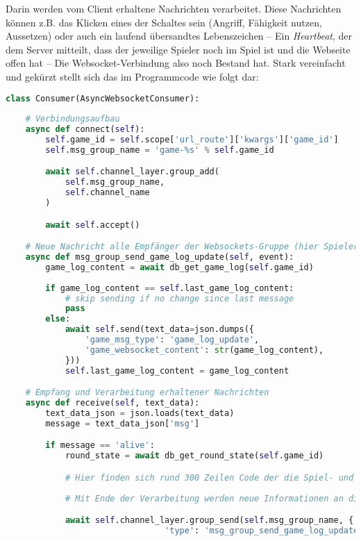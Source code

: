 Darin werden vom Client erhaltene Nachrichten verarbeitet. Diese Nachrichten können z.B. das Klicken eines der Schaltes sein (Angriff, Fähigkeit nutzen, Aussetzen) oder auch ein laufend übersandtes Lebenszeichen -- Ein \textit{Heartbeat}, der dem Server mitteilt, dass der jeweilige Spieler noch im Spiel ist und die Webseite offen hat -- Die Websocket-Verbindung also noch Bestand hat. Stark vereinfacht und gekürzt stellt sich das im Programmcode wie folgt dar: 

\begin{lstlisting}[language=python]
class Consumer(AsyncWebsocketConsumer):
 
    # Verbindungsaufbau
    async def connect(self):
        self.game_id = self.scope['url_route']['kwargs']['game_id']
        self.msg_group_name = 'game-%s' % self.game_id

        await self.channel_layer.group_add(
            self.msg_group_name,
            self.channel_name
        )

        await self.accept()

    # Neue Nachricht alle Empfänger der Websockets-Gruppe (hier Spieler des Spiels) senden
    async def msg_group_send_game_log_update(self, event):
        game_log_content = await db_get_game_log(self.game_id)
        
        if game_log_content == self.last_game_log_content:
            # skip sending if no change since last message
            pass
        else:
            await self.send(text_data=json.dumps({ 
                'game_msg_type': 'game_log_update',
                'game_websocket_content': str(game_log_content),
            }))
            self.last_game_log_content = game_log_content

    # Empfang und Verarbeitung erhaltener Nachrichten
    async def receive(self, text_data):
        text_data_json = json.loads(text_data)
        message = text_data_json['msg']

        if message == 'alive':
            round_state = await db_get_round_state(self.game_id)

            # Hier finden sich rund 300 Zeilen Code der die Spiel- und Rundenlogik abbildet
                
            # Mit Ende der Verarbeitung werden neue Informationen an die Spieler des Spiels übersandt

            await self.channel_layer.group_send(self.msg_group_name, { 
                                'type': 'msg_group_send_game_log_update', })
\end{lstlisting}
    

